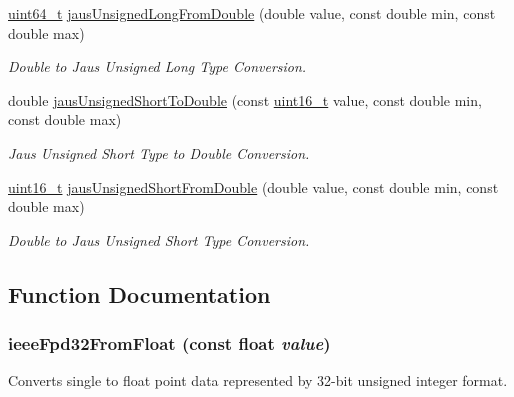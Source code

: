 \begin{CompactItemize}
\hyperlink{libdrdc_8h_aa5d1cd013383c889537491c3cfd9aad}{uint64\_\-t} \hyperlink{group__data__conv_g3aa19ded70d7987e9fdf46fc09696e76}{jausUnsignedLongFromDouble} (double value, const double min, const double max)
\begin{CompactList}\small\item\em Double to Jaus Unsigned Long Type Conversion. \item\end{CompactList}\item 
double \hyperlink{group__data__conv_g1489cc4a07b435646434fe9874ecdb84}{jausUnsignedShortToDouble} (const \hyperlink{libdrdc_8h_273cf69d639a59973b6019625df33e30}{uint16\_\-t} value, const double min, const double max)
\begin{CompactList}\small\item\em Jaus Unsigned Short Type to Double Conversion. \item\end{CompactList}\item 
\hyperlink{libdrdc_8h_273cf69d639a59973b6019625df33e30}{uint16\_\-t} \hyperlink{group__data__conv_g1bd4561881610850037b611c4e1df1d0}{jausUnsignedShortFromDouble} (double value, const double min, const double max)
\begin{CompactList}\small\item\em Double to Jaus Unsigned Short Type Conversion. \item\end{CompactList}\end{CompactItemize}


\subsection{Function Documentation}
\hypertarget{group__data__conv_gce626fd81ac4f79dfc488e327842dd62}{
\subsubsection[ieeeFpd32FromFloat]{ ieeeFpd32FromFloat (const float {\em value})}}
\label{group__data__conv_gce626fd81ac4f79dfc488e327842dd62}


Converts single to float point data represented by 32-bit unsigned integer format. 


